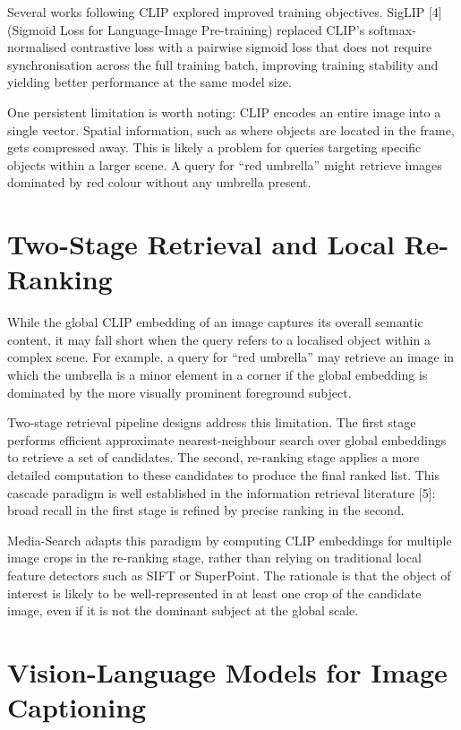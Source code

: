 \documentclass[12pt,a4paper,oneside]{report}
\begin{document}
Several works following CLIP explored improved training objectives. SigLIP [4] (Sigmoid Loss for Language-Image Pre-training) replaced CLIP's softmax-normalised contrastive loss with a pairwise sigmoid loss that does not require synchronisation across the full training batch, improving training stability and yielding better performance at the same model size.

One persistent limitation is worth noting: CLIP encodes an entire image into a single vector. Spatial information, such as where objects are located in the frame, gets compressed away. This is likely a problem for queries targeting specific objects within a larger scene. A query for ``red umbrella'' might retrieve images dominated by red colour without any umbrella present.

\section{Two-Stage Retrieval and Local Re-Ranking}

While the global CLIP embedding of an image captures its overall semantic content, it may fall short when the query refers to a localised object within a complex scene. For example, a query for ``red umbrella'' may retrieve an image in which the umbrella is a minor element in a corner if the global embedding is dominated by the more visually prominent foreground subject.

Two-stage retrieval pipeline designs address this limitation. The first stage performs efficient approximate nearest-neighbour search over global embeddings to retrieve a set of candidates. The second, re-ranking stage applies a more detailed computation to these candidates to produce the final ranked list. This cascade paradigm is well established in the information retrieval literature [5]: broad recall in the first stage is refined by precise ranking in the second.

Media-Search adapts this paradigm by computing CLIP embeddings for multiple image crops in the re-ranking stage, rather than relying on traditional local feature detectors such as SIFT or SuperPoint. The rationale is that the object of interest is likely to be well-represented in at least one crop of the candidate image, even if it is not the dominant subject at the global scale.

\section{Vision-Language Models for Image Captioning}
\end{document}
